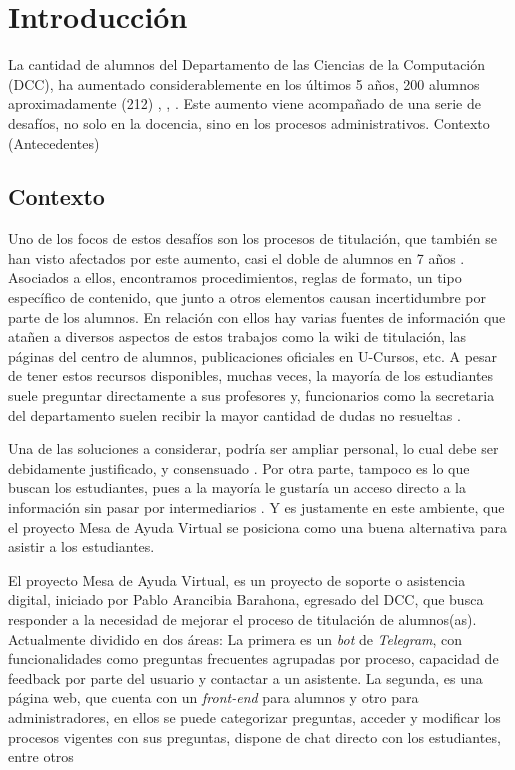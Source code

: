 \chapter{Introducción}\label{chap:intro}

    \par La cantidad de alumnos del Departamento de las Ciencias de la Computación (DCC), ha aumentado considerablemente en los últimos 5 años, 200 alumnos aproximadamente (212) \cite{CADCC2016}, \cite{CaDCC2018}, \cite{CADCC2021}. Este aumento viene acompañado de una serie de desafíos, no solo en la docencia, sino en los procesos administrativos. Contexto (Antecedentes)

\section{Contexto}\label{sec:intro-con}
    \par Uno de los focos de estos desafíos son los procesos de titulación, que también se han visto afectados por este aumento, casi el doble de alumnos en 7 años \cite{ARANCIBIA2021}. Asociados a ellos, encontramos procedimientos, reglas de formato, un tipo específico de contenido, que junto a otros elementos causan incertidumbre por parte de los alumnos. En relación con ellos hay varias fuentes de información que atañen a diversos aspectos de estos trabajos como la wiki de titulación, las páginas del centro de alumnos, publicaciones oficiales en U-Cursos, etc. A pesar de tener estos recursos disponibles, muchas veces, la mayoría de los estudiantes suele preguntar directamente a sus profesores y, funcionarios como la secretaria del departamento suelen recibir la mayor cantidad de dudas no resueltas \cite{ARANCIBIA2021}.
    \par Una de las soluciones a considerar, podría ser ampliar personal, lo cual debe ser debidamente justificado, y consensuado \cite{Chile2014}. Por otra parte, tampoco es lo que buscan los estudiantes, pues a la mayoría le gustaría un acceso directo a la información sin pasar por intermediarios \cite{ARANCIBIA2021}. Y es justamente en este ambiente, que el proyecto Mesa de Ayuda Virtual se posiciona como una buena alternativa para asistir a los estudiantes.
    \par El proyecto Mesa de Ayuda Virtual, es un proyecto de soporte o asistencia digital, iniciado por Pablo Arancibia Barahona, egresado del DCC, que busca responder a la necesidad de mejorar el proceso de titulación de alumnos(as). Actualmente dividido en dos áreas: La primera es un \textit{bot} de \textit{Telegram}, con funcionalidades como preguntas frecuentes agrupadas por proceso, capacidad de feedback por parte del usuario y contactar a un asistente. La segunda, es una página web, que cuenta con un \textit{front-end} para alumnos y otro para administradores, en ellos se puede categorizar preguntas, acceder y modificar los procesos vigentes con sus preguntas, dispone de chat directo con los estudiantes, entre otros
